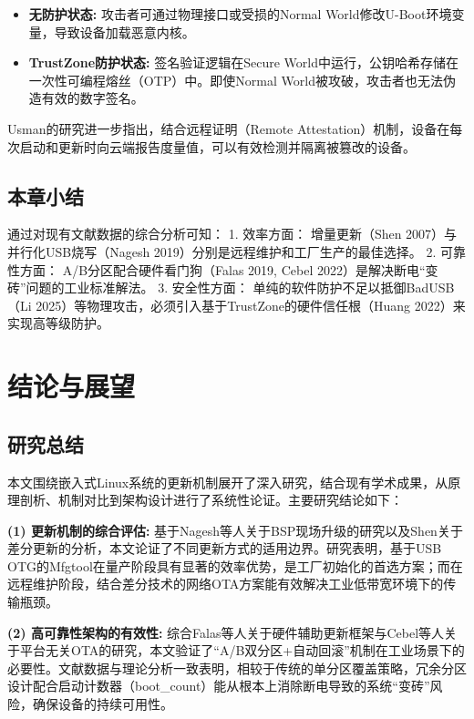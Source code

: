 \documentclass[a4paper,12pt]{article}
\begin{document}
\begin{itemize}
   \item \textbf{无防护状态:} 攻击者可通过物理接口或受损的Normal World修改U-Boot环境变量，导致设备加载恶意内核。
   \item \textbf{TrustZone防护状态:} 签名验证逻辑在Secure World中运行，公钥哈希存储在一次性可编程熔丝（OTP）中。即使Normal World被攻破，攻击者也无法伪造有效的数字签名。
\end{itemize}

Usman的研究进一步指出，结合远程证明（Remote Attestation）机制，设备在每次启动和更新时向云端报告度量值，可以有效检测并隔离被篡改的设备\cite{Usman2025}。

\subsection{本章小结}
通过对现有文献数据的综合分析可知：
1. 效率方面： 增量更新（Shen 2007）与并行化USB烧写（Nagesh 2019）分别是远程维护和工厂生产的最佳选择。
2. 可靠性方面： A/B分区配合硬件看门狗（Falas 2019, Cebel 2022）是解决断电“变砖”问题的工业标准解法。
3. 安全性方面： 单纯的软件防护不足以抵御BadUSB（Li 2025）等物理攻击，必须引入基于TrustZone的硬件信任根（Huang 2022）来实现高等级防护。
\newpage
\section{结论与展望}

\subsection{研究总结}
本文围绕嵌入式Linux系统的更新机制展开了深入研究，结合现有学术成果，从原理剖析、机制对比到架构设计进行了系统性论证。主要研究结论如下：

\textbf{(1) 更新机制的综合评估:} 
基于Nagesh等人关于BSP现场升级的研究以及Shen关于差分更新的分析\cite{Nagesh2019, Shen2007}，本文论证了不同更新方式的适用边界。研究表明，基于USB OTG的Mfgtool在量产阶段具有显著的效率优势，是工厂初始化的首选方案；而在远程维护阶段，结合差分技术的网络OTA方案能有效解决工业低带宽环境下的传输瓶颈。

\textbf{(2) 高可靠性架构的有效性:} 
综合Falas等人关于硬件辅助更新框架与Cebel等人关于平台无关OTA的研究\cite{Falas2019, Cebel2022}，本文验证了“A/B双分区+自动回滚”机制在工业场景下的必要性。文献数据与理论分析一致表明，相较于传统的单分区覆盖策略，冗余分区设计配合启动计数器（boot\_count）能从根本上消除断电导致的系统“变砖”风险，确保设备的持续可用性。
\end{document}
